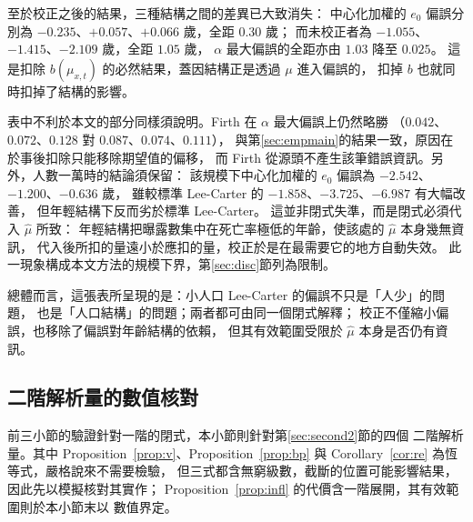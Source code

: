 \documentclass[UTF8, fontset=macnew, a4paper, 12pt]{ctexart}
\begin{document}
至於校正之後的結果，三種結構之間的差異已大致消失：
中心化加權的 $e_0$ 偏誤分別為 $-0.235$、$+0.057$、$+0.066$ 歲，全距 $0.30$ 歲；
而未校正者為 $-1.055$、$-1.415$、$-2.109$ 歲，全距 $1.05$ 歲，
$\alpha$ 最大偏誤的全距亦由 $1.03$ 降至 $0.025$。
這是扣除 $b(\mu_{x,t})$ 的必然結果，蓋因結構正是透過 $\mu$ 進入偏誤的，
扣掉 $b$ 也就同時扣掉了結構的影響。

表中不利於本文的部分同樣須說明。Firth 在 $\alpha$ 最大偏誤上仍然略勝
（$0.042$、$0.072$、$0.128$ 對 $0.087$、$0.074$、$0.111$），
與第\ref{sec:empmain}的結果一致，原因在於事後扣除只能移除期望值的偏移，
而 Firth 從源頭不產生該筆錯誤資訊。另外，人數一萬時的結論須保留：
該規模下中心化加權的 $e_0$ 偏誤為 $-2.542$、$-1.200$、$-0.636$ 歲，
雖較標準 Lee-Carter 的 $-1.858$、$-3.725$、$-6.987$ 有大幅改善，
但年輕結構下反而劣於標準 Lee-Carter。
這並非閉式失準，而是閉式必須代入 $\hat\mu$ 所致：
年輕結構把曝露數集中在死亡率極低的年齡，使該處的 $\hat\mu$ 本身幾無資訊，
代入後所扣的量遠小於應扣的量，校正於是在最需要它的地方自動失效。
此一現象構成本文方法的規模下界，第\ref{sec:disc}節列為限制。

總體而言，這張表所呈現的是：小人口 Lee-Carter 的偏誤不只是「人少」的問題，
也是「人口結構」的問題；兩者都可由同一個閉式解釋；
校正不僅縮小偏誤，也移除了偏誤對年齡結構的依賴，
但其有效範圍受限於 $\hat\mu$ 本身是否仍有資訊。


\subsection{二階解析量的數值核對}\label{sec:vcheck}\label{sec:vsd}\label{sec:vinfl}

前三小節的驗證針對一階的閉式，本小節則針對第\ref{sec:second2}節的四個
二階解析量。其中 Proposition~\ref{prop:v}、Proposition~\ref{prop:bp} 與
Corollary~\ref{cor:re} 為恆等式，嚴格說來不需要檢驗，
但三式都含無窮級數，截斷的位置可能影響結果，因此先以模擬核對其實作；
Proposition~\ref{prop:infl} 的代價含一階展開，其有效範圍則於本小節末以
數值界定。
\end{document}
